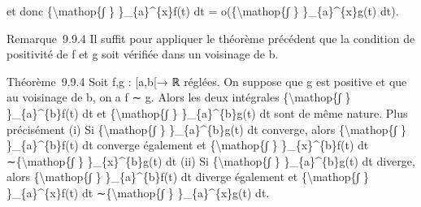 \documentclass[]{article}
\begin{document}
et donc \{\textbackslash{}mathop\{∫ \} \}\_\{a\}\^{}\{x\}f(t) dt =
o(\{\textbackslash{}mathop\{∫ \} \}\_\{a\}\^{}\{x\}g(t) dt).

Remarque~9.9.4 Il suffit pour appliquer le théorème précédent que la
condition de positivité de f et g soit vérifiée dans un voisinage de b.

Théorème~9.9.4 Soit f,g : {[}a,b{[}→ ℝ réglées. On suppose que g est
positive et que au voisinage de b, on a f ∼ g. Alors les deux intégrales
\{\textbackslash{}mathop\{∫ \} \}\_\{a\}\^{}\{b\}f(t) dt et
\{\textbackslash{}mathop\{∫ \} \}\_\{a\}\^{}\{b\}g(t) dt sont de même
nature. Plus précisément (i) Si \{\textbackslash{}mathop\{∫ \}
\}\_\{a\}\^{}\{b\}g(t) dt converge, alors \{\textbackslash{}mathop\{∫ \}
\}\_\{a\}\^{}\{b\}f(t) dt converge également et
\{\textbackslash{}mathop\{∫ \} \}\_\{x\}\^{}\{b\}f(t) dt
∼\{\textbackslash{}mathop\{∫ \} \}\_\{x\}\^{}\{b\}g(t) dt (ii) Si
\{\textbackslash{}mathop\{∫ \} \}\_\{a\}\^{}\{b\}g(t) dt diverge, alors
\{\textbackslash{}mathop\{∫ \} \}\_\{a\}\^{}\{b\}f(t) dt diverge
également et \{\textbackslash{}mathop\{∫ \} \}\_\{a\}\^{}\{x\}f(t) dt
∼\{\textbackslash{}mathop\{∫ \} \}\_\{a\}\^{}\{x\}g(t) dt.
\end{document}
